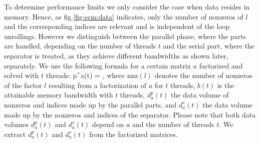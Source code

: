 To determine performance limits we only consider the case when data resides in
memory.
Hence, as fig.\ref{fig:ecm:data} indicates, only the number of nonzeros of $l$ and the
corresponding indices are relevant and is independent of the loop unrollings.
%
However we distinguish between the parallel phase, where the parts are handled,
depending on the number of threads $t$ and the serial part, where the separator
is treated, as they achieve different bandwidths as shown later, separately.
We use the following formula for a certain matrix $a$ factorized and solved with
$t$ threads:
%
\be
  p^{a}(t) 
  =  ,
\ee
%
where $\text{nnz}(l)$ denotes the number of nonzeros of the factor $l$ 
resulting from a factorization of $a$ for $t$ threads,
$b(t)$ is the attainable memory bandwidth with $t$ threads,
$d_a^p(t)$ the data volume of nonzeros and indices made up by the parallel 
parts, and $d_a^s(t)$ the data volume made up by the nonzeros and indices of the
separator.
%
Please note that both data volumes $d_a^p(t)$ and $d_a^s(t)$ depend on
$a$ and the number of threads $t$.
%
We extract $d_a^p(t)$ and $d_a^s(t)$ from the factorized matrices.
%


